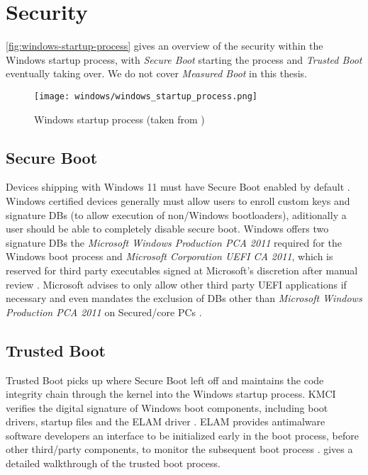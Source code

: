 
\section{Security}

\autoref{fig:windows-startup-process} gives an overview of the security within the Windows startup process, with \emph{Secure Boot} starting the process and \emph{Trusted Boot} eventually taking over.
We do not cover \emph{Measured Boot} in this thesis.

\begin{figure}[phtb]
    \centering
    \texttt{[image: windows/windows\_startup\_process.png]}
    \caption{Windows startup process (taken from \cite{microsoft-secure-the-windows-boot-process})}
    \label{fig:windows-startup-process}
\end{figure}

\subsection{Secure Boot}

Devices shipping with Windows 11 must have Secure Boot enabled by default \cite{microsoft-windows-minimum-hardware-requirements-overview}.
Windows certified devices generally must allow users to enroll custom keys and signature \acp{DB} (to allow execution of non\-/Windows bootloaders), aditionally a user should be able to completely disable secure boot.
Windows offers two signature \acp{DB} the \emph{Microsoft Windows Production PCA 2011} required for the Windows boot process and \emph{Microsoft Corporation \ac{UEFI} \ac{CA} 2011}, which is reserved for third party executables signed at Microsoft's discretion after manual review \cite{microsoft-uefi-signing}.
Microsoft advises to only allow other third party \ac{UEFI} applications if necessary and even mandates the exclusion of \acp{DB} other than \emph{Microsoft Windows Production PCA 2011} on Secured\-/core \acp{PC} \cite{microsoft-secure-the-windows-boot-process}.

\subsection{Trusted Boot}

Trusted Boot picks up where Secure Boot left off and maintains the code integrity chain through the kernel into the Windows startup process.
\ac{KMCI} verifies the digital signature of Windows boot components, including boot drivers, startup files and the \ac{ELAM} driver \cite{microsoft-trusted-boot}.
\ac{ELAM} provides antimalware software developers an interface to be initialized early in the boot process, before other third\-/party components, to monitor the subsequent boot process \cite{micosoft-windows-elam}.
\cite{understanding-windows-trusted-boot} gives a detailed walkthrough of the trusted boot process.

